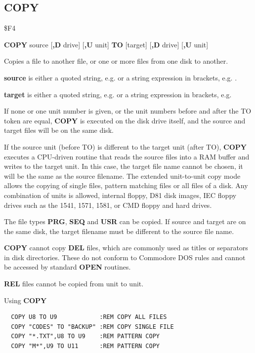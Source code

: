 \subsection{COPY}
\begin{description}[leftmargin=2cm,style=nextline]
\item [Token:] \$F4
\item [Format:] {\bf COPY} source [{\bf,D} drive] [{\bf,U} unit] {\bf TO}
                [target] [{\bf ,D} drive] [{\bf ,U} unit]
\item [Usage:]
   Copies a file to another file, or one or more files from one disk to another.

   {\bf source} is either a quoted string, e.g.  or
   a string expression in brackets, e.g. .

   {\bf target} is either a quoted string, e.g.  or
   a string expression in brackets, e.g. 

   \drivedefinition

   \unitdefinition

   If none or one unit number is given, or the unit numbers before and after
   the TO token are equal, {\bf COPY} is executed on the disk drive
   itself, and the source and target files will be on the same disk.

   If the source unit (before TO) is different to the target unit (after TO),
   {\bf COPY} executes a CPU-driven routine that reads the source
   files into a RAM buffer and writes to the target unit. In this case,
   the target file name cannot be chosen, it will be the same as the
   source filename. The extended unit-to-unit copy mode allows the copying of
   single files, pattern matching files or all files of a disk.
   Any combination of units is allowed, internal floppy, D81 disk images,
   IEC floppy drives such as the 1541, 1571, 1581, or CMD floppy and hard drives.

\item [Remarks:]
   The file types {\bf PRG}, {\bf SEQ} and {\bf USR} can be copied.
   If source and target are on the same disk, the target filename
   must be different to the source file name.

   {\bf COPY} cannot copy {\bf DEL} files, which are commonly used
   as titles or separators in disk directories. These do not conform to
   Commodore DOS rules and cannot be accessed by standard {\bf OPEN} routines.

   {\bf REL} files cannot be copied from unit to unit.

\item [Examples:] Using {\bf COPY}
\begin{tcolorbox}[colback=black,coltext=white]
\verbatimfont{\codefont}
\begin{verbatim}
  COPY U8 TO U9            :REM COPY ALL FILES
  COPY "CODES" TO "BACKUP" :REM COPY SINGLE FILE
  COPY "*.TXT",U8 TO U9    :REM PATTERN COPY
  COPY "M*",U9 TO U11      :REM PATTERN COPY
\end{verbatim}
\end{tcolorbox}
\end{description}

